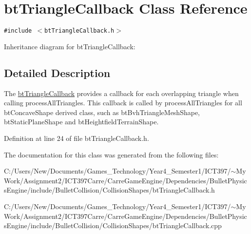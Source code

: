 \hypertarget{classbt_triangle_callback}{
\section{btTriangleCallback Class Reference}
\label{classbt_triangle_callback}
}
{\tt \#include $<$btTriangleCallback.h$>$}

Inheritance diagram for btTriangleCallback:

\subsection{Detailed Description}
The \hyperlink{classbt_triangle_callback}{btTriangleCallback} provides a callback for each overlapping triangle when calling processAllTriangles. This callback is called by processAllTriangles for all btConcaveShape derived class, such as btBvhTriangleMeshShape, btStaticPlaneShape and btHeightfieldTerrainShape. 

Definition at line 24 of file btTriangleCallback.h.

The documentation for this class was generated from the following files:\begin{CompactItemize}
\item 
C:/Users/New/Documents/Games\_\-Technology/Year4\_\-Semester1/ICT397/$\sim$My Work/Assignment2/ICT397Carre/CarreGameEngine/Dependencies/BulletPhysicsEngine/include/BulletCollision/CollisionShapes/btTriangleCallback.h\item 
C:/Users/New/Documents/Games\_\-Technology/Year4\_\-Semester1/ICT397/$\sim$My Work/Assignment2/ICT397Carre/CarreGameEngine/Dependencies/BulletPhysicsEngine/include/BulletCollision/CollisionShapes/btTriangleCallback.cpp\end{CompactItemize}
